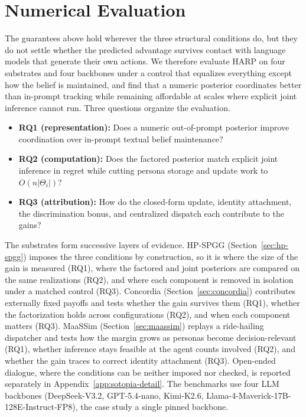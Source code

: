\documentclass[letterpaper]{article} %
\begin{document}
\section{Numerical Evaluation}
\label{sec:experiments-llm}

The guarantees above hold wherever the three structural conditions do, but they do not settle whether the predicted advantage survives contact with language models that generate their own actions. We therefore evaluate HARP on four substrates and four backbones under a control that equalizes everything except how the belief is maintained, and find that a numeric posterior coordinates better than in-prompt tracking while remaining affordable at scales where explicit joint inference cannot run. Three questions organize the evaluation.
\begin{itemize}[leftmargin=1.5em, itemsep=0.2em, topsep=0.2em, parsep=0pt]
\item \textbf{RQ1 (representation):} Does a numeric out-of-prompt posterior improve coordination over in-prompt textual belief maintenance?
\item \textbf{RQ2 (computation):} Does the factored posterior match explicit joint inference in regret while cutting persona storage and update work to $O(n|\Theta_i|)$?
\item \textbf{RQ3 (attribution):} How do the closed-form update, identity attachment, the discrimination bonus, and centralized dispatch each contribute to the gains?
\end{itemize}



The substrates form successive layers of evidence. HP-SPGG (Section~\ref{sec:hp-spgg}) imposes the three conditions by construction, so it is where the size of the gain is measured (RQ1), where the factored and joint posteriors are compared on the same realizations (RQ2), and where each component is removed in isolation under a matched control (RQ3). Concordia (Section~\ref{sec:concordia}) contributes externally fixed payoffs and tests whether the gain survives them (RQ1), whether the factorization holds across configurations (RQ2), and when each component matters (RQ3). MaaSSim (Section~\ref{sec:maassim}) replays a ride-hailing dispatcher and tests how the margin grows as personas become decision-relevant (RQ1), whether inference stays feasible at the agent counts involved (RQ2), and whether the gain traces to correct identity attachment (RQ3). Open-ended dialogue, where the conditions can be neither imposed nor checked, is reported separately in Appendix~\ref{app:sotopia-detail}. The benchmarks use four LLM backbones (DeepSeek-V3.2, GPT-5.4-nano, Kimi-K2.6, Llama-4-Maverick-17B-128E-Instruct-FP8), the case study a single pinned backbone.
\end{document}
